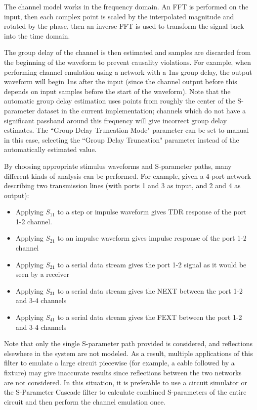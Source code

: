 The channel model works in the frequency domain. An FFT is performed on the input, then each complex point is scaled by
the interpolated magnitude and rotated by the phase, then an inverse FFT is used to transform the signal back into the
time domain.

The group delay of the channel is then estimated and samples are discarded from the beginning of the waveform to
prevent causality violations. For example, when performing channel emulation using a network with a 1ns group delay,
the output waveform will begin 1ns after the input (since the channel output before this depends on input samples
before the start of the waveform). Note that the automatic group delay estimation uses points from roughly the center
of the S-parameter dataset in the current implementation; channels which do not have a significant passband around this
frequency will give incorrect group delay estimates. The ``Group Delay Truncation Mode" parameter can be set to manual
in this case, selecting the ``Group Delay Truncation" parameter instead of the automatically estimated value.

By choosing appropriate stimulus waveforms and S-parameter paths, many different kinds of analysis can be performed.
For example, given a 4-port network describing two transmission lines (with ports 1 and 3 as input, and 2 and 4 as
output):
\begin{itemize}
\item Applying $S_{11}$ to a step or impulse waveform gives TDR response of the port 1-2 channel.
\item Applying $S_{21}$ to an impulse waveform gives impulse response of the port 1-2 channel
\item Applying $S_{21}$ to a serial data stream gives the port 1-2 signal as it would be seen by a receiver
\item Applying $S_{31}$ to a serial data stream gives the NEXT between the port 1-2 and 3-4 channels
\item Applying $S_{41}$ to a serial data stream gives the FEXT between the port 1-2 and 3-4 channels
\end{itemize}

Note that only the single S-parameter path provided is considered, and reflections elsewhere in the system are not
modeled. As a result, multiple applications of this filter to emulate a large circuit piecewise (for example, a cable
followed by a fixture) may give inaccurate results since reflections between the two networks are not considered. In
this situation, it is preferable to use a circuit simulator or the S-Parameter Cascade filter to calculate combined
S-parameters of the entire circuit and then perform the channel emulation once.

